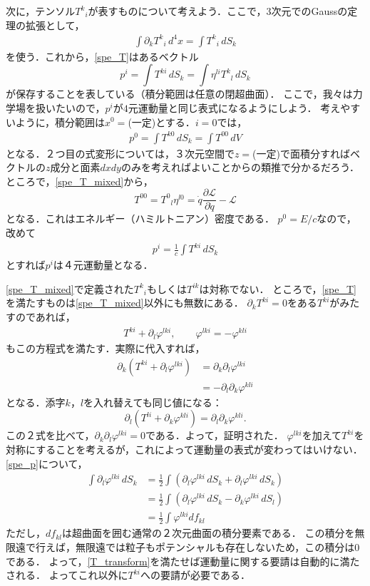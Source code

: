 \documentclass[a4paper]{ltjsreport}
\begin{document}
次に，テンソル${T^k}_i$が表すものについて考えよう．ここで，$3$次元でのGaussの定理の拡張として，
\begin{align}
  \int\partial_k{T^k}_i\,d^4x=\int{}{T^k}_i\,dS_k
\end{align}
を使う．これから，\eqref{spe_T}はあるベクトル
\[p^i=\int{T^{ki}}\,dS_k=\int\eta^{li}{{T^k}_l}\,dS_k\]
が保存することを表している（積分範囲は任意の閉超曲面）．
ここで，我々は力学場を扱いたいので，$p^i$が$4$元運動量と同じ表式になるようにしよう．
考えやすいように，積分範囲は$x^0=$(一定)とする．$i=0$では，
\begin{align}
  p^0=\int{T^{k0}}\,dS_k=\int{T^{00}}\,dV
\end{align}
となる．２つ目の式変形については，３次元空間で$z=$(一定)で面積分すればベクトルの$z$成分と面素$dxdy$のみを考えればよいことからの類推で分かるだろう．
ところで，\eqref{spe_T_mixed}から，
\[T^{00}={T^0}_l\eta^{l0}=\dot{q}\frac{\partial{\mathcal{L}}}{\partial\dot{q}} - \mathcal{L}\]
となる．これはエネルギー（ハミルトニアン）密度である．
$p^0=E/c$なので，改めて
\begin{align}
  p^i=\frac{1}{c}\int{T^{ki}}\,dS_k\label{spe_p}
\end{align}
とすれば$p^i$は４元運動量となる．

\eqref{spe_T_mixed}で定義された${T^k}_i$もしくは$T^{ik}$は対称でない．
ところで，\eqref{spe_T}を満たすものは\eqref{spe_T_mixed}以外にも無数にある．
$\partial_kT^{ki}=0$をある$T^{ki}$がみたすのであれば，
\begin{align}
  T^{ki} + \partial_l\varphi^{lki},\qquad\varphi^{lki}= - \varphi^{kli}\label{T_transform}
\end{align}
もこの方程式を満たす．実際に代入すれば，
\begin{align*}
  \partial_k\left(T^{ki} + \partial_l\varphi^{lki}\right) &= \partial_k\partial_l\varphi^{lki}\\
  &=  - \partial_l\partial_k\varphi^{kli}
\end{align*}
となる．添字$k$，$l$を入れ替えても同じ値になる：
\[\partial_l\left(T^{li} + \partial_k\varphi^{kli}\right)=\partial_l\partial_k\varphi^{kli}.\]
この２式を比べて，$\partial_k\partial_l\varphi^{lki}=0$である．よって，証明された．
$\varphi^{lki}$を加えて$T^{ki}$を対称にすることを考えるが，これによって運動量の表式が変わってはいけない．
\eqref{spe_p}について，
\begin{align*}
  \int\partial_l\varphi^{lki}\,dS_k &= \frac{1}{2}\int\left(\partial_l\varphi^{lki}\,dS_k + \partial_l\varphi^{lki}\,dS_k\right)\\
  &= \frac{1}{2}\int\left(\partial_l\varphi^{lki}\,dS_k - \partial_k\varphi^{lki}\,dS_l\right)\\
  &= \frac{1}{2}\int\varphi^{lki}df_{kl}
\end{align*}
ただし，$df_{kl}$は超曲面を囲む通常の２次元曲面の積分要素である．
この積分を無限遠で行えば，無限遠では粒子もポテンシャルも存在しないため，この積分は0である．
よって，\eqref{T_transform}を満たせば運動量に関する要請は自動的に満たされる．
よってこれ以外に$T^{ki}$への要請が必要である．
\end{document}
